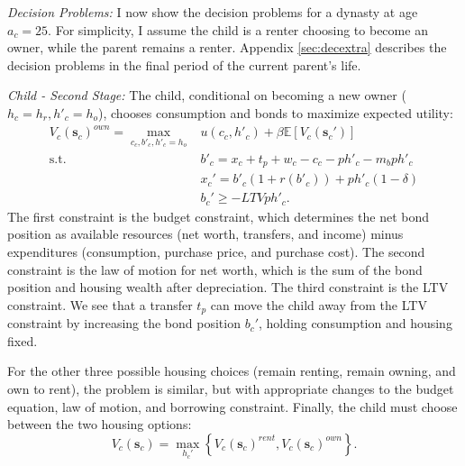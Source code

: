 \documentclass[12pt]{article}
\newcommand{\E}{\mathbb{E}}
\begin{document}
\textit{Decision Problems:} 
I now show the decision problems for a dynasty at age $a_c=25$. For simplicity, I assume the child is a renter choosing to become an owner, while the parent remains a renter. Appendix \ref{sec:decextra} describes the decision problems in the final period of the current parent's life.

\textit{Child - Second Stage:} The child, conditional on becoming a new owner ($h_c=h_r,h'_c=h_o$), chooses consumption and bonds to maximize expected utility:
\begin{equation}\label{eq:Vk}
\begin{split}
 V_c(\mathbf{s}_c)^{own} = \max_{c_c,b'_c,h'_c=h_o} & u(c_c,h'_c) + \beta \E\left[V_{c}(\mathbf{s}_c') \right] \\ 
 \text{s.t.}\quad & 	b'_c = x_c + t_p + w_c - c_c - p h'_c - m_b p h'_c \\
 & x_c' = b'_c(1+r(b'_c)) + p h'_c(1-\delta) \\
 & b_c' \ge - LTV p h'_c. 
\end{split}
\end{equation}
The first constraint is the budget constraint, which determines the net bond position as available resources (net worth, transfers, and income) minus expenditures (consumption, purchase price, and purchase cost). The second constraint is the law of motion for net worth, which is the sum of the bond position and housing wealth after depreciation. The third constraint is the LTV constraint. We see that a transfer $t_p$ can move the child away from the LTV constraint by increasing the bond position $b_c'$, holding consumption and housing fixed. 

For the other three possible housing choices (remain renting, remain owning, and own to rent), the problem is similar, but with appropriate changes to the budget equation, law of motion, and borrowing constraint. Finally, the child must choose between the two housing options:
\begin{equation}
	V_c(\mathbf{s}_c) = \max_{h_c'} \left\{V_c(\mathbf{s}_c)^{rent},V_c(\mathbf{s}_c)^{own}\right\}.
\end{equation}
\end{document}
